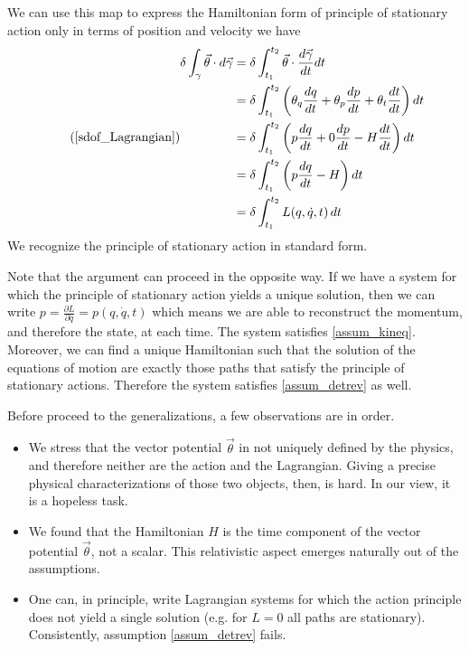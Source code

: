 \documentclass[10pt,twocolumn, nofootinbib]{revtex4-2}
\begin{document}
We can use this map to express the Hamiltonian form of principle of stationary action only in terms of position and velocity we have
\begin{equation}
\tag*{(\ref{sdof_Lagrangian})}
	\begin{aligned}
		\delta \int_\gamma \vec{\theta} \cdot d\vec{\gamma} &= \delta \int^{t_2}_{t_1} \vec{\theta} \cdot \frac{d\vec{\gamma}}{dt} dt \\
		&= \delta \int^{t_2}_{t_1} \left(\theta_q \frac{dq}{dt} + \theta_p \frac{dp}{dt} + \theta_t \frac{dt}{dt}\right) dt \\
		&= \delta\int^{t_2}_{t_1} \left(p \frac{dq}{dt} + 0 \frac{dp}{dt} - H \frac{dt}{dt}\right) dt \\
		&= \delta \int^{t_2}_{t_1} \left(p \frac{dq}{dt} - H\right) dt \\
		&= \delta \int^{t_2}_{t_1} L(q, \dot{q}, t) \, dt
	\end{aligned}
\end{equation}
We recognize the principle of stationary action in standard form.

Note that the argument can proceed in the opposite way. If we have a system for which the principle of stationary action yields a unique solution, then we can write $p=\frac{\partial L}{\partial \dot{q}} = p(q, \dot{q}, t)$ which means we are able to reconstruct the momentum, and therefore the state, at each time. The system satisfies \ref{assum_kineq}. Moreover, we can find a unique Hamiltonian such that the solution of the equations of motion are exactly those paths that satisfy the principle of stationary actions. Therefore the system satisfies \ref{assum_detrev} as well.

Before proceed to the generalizations, a few observations are in order.
\begin{itemize}
	\item We stress that the vector potential $\vec{\theta}$ in not uniquely defined by the physics, and therefore neither are the action and the Lagrangian. Giving a precise physical characterizations of those two objects, then, is hard. In our view, it is a hopeless task.
	\item We found that the Hamiltonian $H$ is the time component of the vector potential $\vec{\theta}$, not a scalar. This relativistic aspect emerges naturally out of the assumptions.
	\item One can, in principle, write Lagrangian systems for which the action principle does not yield a single solution (e.g. for $L=0$ all paths are stationary). Consistently, assumption \ref{assum_detrev} fails.
\end{itemize}
\end{document}
